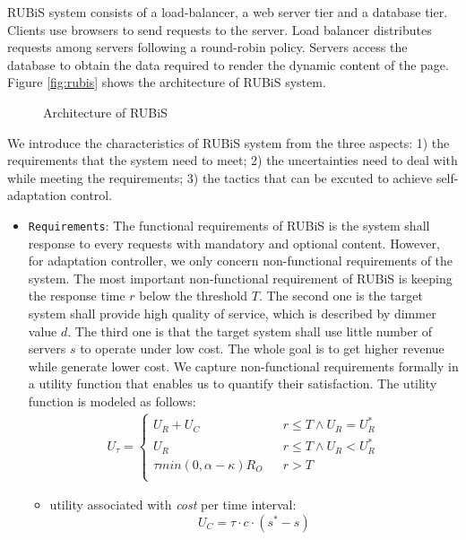 \documentclass[sigconf]{acmart}
\begin{document}
RUBiS system consists of a load-balancer, a web server tier and a database tier. Clients use browsers to send requests to the server. Load balancer distributes requests among servers following a round-robin policy. Servers access the database to obtain the data required to render the dynamic content of the page.
Figure \ref{fig:rubis} shows the architecture of RUBiS system. 
\begin{figure}[h]
	\centering
	\caption{Architecture of RUBiS}
\end{figure}
We introduce the characteristics of RUBiS system from the three aspects: 1) the requirements that the system need to meet; 2) the uncertainties need to deal with while meeting the requirements; 3) the tactics that can be excuted to achieve self-adaptation control.
\begin{itemize}
		\item {\verb|Requirements|}:
	The functional requirements of RUBiS is the system shall response to every requests with mandatory and optional content. However, for adaptation controller, we only concern non-functional requirements of the system. The most important non-functional requirement of RUBiS is keeping the response time $r$ below the threshold $T$. The second one is the target system shall provide high quality of service, which is described by dimmer value $d$. The third one is that the target system shall use little number of servers $s$ to operate under low cost. The whole goal is to get higher revenue while generate lower cost. We capture non-functional requirements formally in a utility function that enables us to quantify their satisfaction. The utility function is modeled as follows:
	\begin{equation}
	\begin{aligned}
	U_{\tau}=\left\{
	\begin{array}{rcl}
	U_{R}+U_{C} & & { r\leq T\wedge U_{R}=U_{R}^{*}} \\
	U_{R} & & {r\leq T\wedge U_{R}<U_{R}^{*}}\\
	\tau min(0,\alpha-\kappa)R_{O} & & {r>T}\\
	\end{array} \right.
	\end{aligned}
	\end{equation}
	\begin{itemize}
		\item utility associated with \textit{cost }per time interval:
		\begin{equation}
		U_{C}=\tau \cdot c\cdot (s^{*}-s)

\end{equation}
\end{itemize}
\end{itemize}
\end{document}
